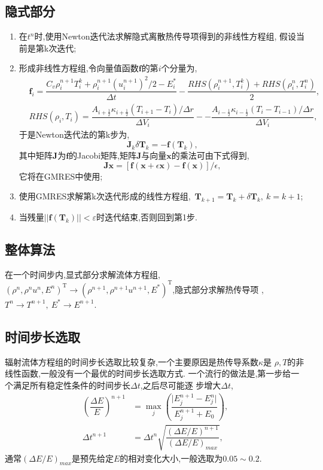 \documentclass[a4paper, 11pt]{ctexart}
\numberwithin{equation}{section}
\numberwithin{figure}{section}
\newcommand\bx{\boldsymbol{x}}
\newcommand\bJ{\boldsymbol{J}}
\newcommand\bT{\boldsymbol{T}}
\newcommand\abs[1]{\lvert #1 \rvert}
\newcommand\norm[1]{\lvert\lvert #1 \rvert\rvert}
\begin{document}
\subsection{隐式部分}
\begin{enumerate}
  \item 在$t^n$时,使用Newton迭代法求解隐式离散热传导项得到的非线性方程组,
    假设当前是第k次迭代;
  \item 形成非线性方程组,令向量值函数$\boldsymbol{f}$的第$i$个分量为,
    \begin{align}
      &\boldsymbol{f}_i=\dfrac{C_v\rho_i^{n+1}T_i^k+\rho_i^{n+1}(u_i^{n+1})^2/2-E_i^*}{\Delta
      t}-\dfrac{RHS(\rho_i^{n+1},T_i^k)+RHS(\rho_i^{n},T_i^n)}{2},\\
      &RHS(\rho_i,T_i)=\dfrac{A_{i+\frac12}\kappa_{i+\frac12}(T_{i+1}-T_i)/\Delta r}{\Delta V_i}-
      -\dfrac{A_{i-\frac12}\kappa_{i-\frac12}(T_{i}-T_{i-1})/\Delta r}{\Delta V_i},
    \end{align}
    于是Newton迭代法的第k步为,
    \begin{equation}
      \bJ_k\delta \bT_k = -\boldsymbol{f}(\bT_k),
    \end{equation}
    其中矩阵$\bJ$为$\boldsymbol{f}$的Jacobi矩阵,矩阵$\bJ$与向量$\bx$的乘法可由下式得到,
    \begin{equation}
      \bJ \bx=[\boldsymbol{f}(\bx+\epsilon\bx)-\boldsymbol{f}(\bx)]/\epsilon,
    \end{equation}
    它将在GMRES中使用;
  \item 使用GMRES求解第k次迭代形成的线性方程组,~$\bT_{k+1}=\bT_k+\delta \bT_k,\ k=k+1$;
  \item 当残量$\norm{\boldsymbol{f}(\bT_k)}<\varepsilon$时迭代结束,否则回到第1步.
\end{enumerate}

\subsection{整体算法}
在一个时间步内,显式部分求解流体方程组,~$(\rho^n,\rho^n u^n,E^n)^\mathrm{T}\rightarrow
(\rho^{n+1},\rho^{n+1} u^{n+1},E^*)^\mathrm{T}$,隐式部分求解热传导项
,~$T^n\rightarrow T^{n+1},\ E^*\rightarrow E^{n+1}$.

\subsection{时间步长选取}
辐射流体方程组的时间步长选取比较复杂,一个主要原因是热传导系数$\kappa$是
$\rho,T$的非线性函数,一般没有一个最优的时间步长选取方式.
一个流行的做法是,第一步给一个满足所有稳定性条件的时间步长$\Delta t$,之后尽可能逐
步增大$\Delta t$,
\begin{align}
  \left(\dfrac{\Delta E}{E}\right)^{n+1}&=\max _j\left(\dfrac{\abs{E^{n+1}_j-E^n_j}}{E^{n+1}_j+E_0}\right),\\
    \Delta t^{n+1}&=\Delta t^n\sqrt{\dfrac{(\Delta E/E)^{n+1}}{(\Delta E/E)_{max}}},
\end{align}
通常${(\Delta E/E)_{max}}$是预先给定$E$的相对变化大小,一般选取为$0.05\sim 0.2$.
\end{document}
